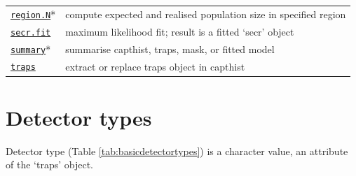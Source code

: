 \documentclass[
]{book}
\begin{document}
\begin{longtable}[]{@{}
  >{\raggedright\arraybackslash}p{}
  >{\raggedright\arraybackslash}p{}@{}}
\href{https://www.otago.ac.nz/density/html/region.N.html}{\texttt{region.N}}* & compute expected and realised population size in specified region \\
\href{https://www.otago.ac.nz/density/html/secr.fit.html}{\texttt{secr.fit}} & maximum likelihood fit; result is a fitted `secr' object \\
\href{https://www.otago.ac.nz/density/html/print.secr.html}{\texttt{summary}}* & summarise capthist, traps, mask, or fitted model \\
\href{https://www.otago.ac.nz/density/html/traps.html}{\texttt{traps}} & extract or replace traps object in capthist \\
\end{longtable}

\section{Detector types}\label{detector-types}


Detector type (Table \ref{tab:basicdetectortypes}) is a character value, an attribute of the `traps' object.
\end{document}
